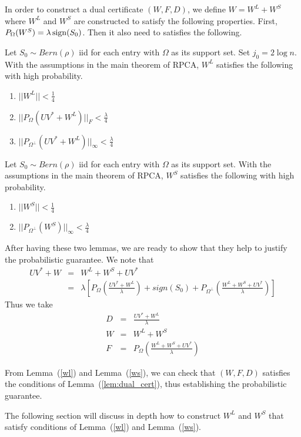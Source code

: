 In order to construct a dual certificate $(W, F, D)$, we define $W = W^{L}+W^{S}$ where $W^{L}$ and $W^{S}$ are constructed to satisfy the following
properties. First, $P_{\Omega}(W^{S}) = \lambda \operatorname{sign}(S_0)$. Then it also need to satisfies the following.

\begin{lemma} \label{wl} Let $S_0\sim Bern(\rho)$ iid for each entry with $\Omega$
as its support set. Set $j_{0}=2\log n$. With the assumptions in
the main theorem of RPCA, $W^{L}$ satisfies the following with high
probability.
\begin{enumerate}
\item $||W^{L}||<\frac{1}{4}$
\item $||P_{\Omega}(UV^{*}+W^{L})||_{F}<\frac{\lambda}{4}$
\item $||P_{\Omega^{\bot}}(UV^{*}+W^{L})||_{\infty}<\frac{\lambda}{4}$
\end{enumerate}
\end{lemma}

\begin{lemma} \label{ws} Let $S_0\sim Bern(\rho)$ iid for each entry with $\Omega$
as its support set. With the assumptions in the main theorem of RPCA,
$W^{S}$ satisfies the following with high probability.
\begin{enumerate}
\item $||W^{S}||<\frac{1}{4}$
\item $||P_{\Omega^{\bot}}(W^{S})||_{\infty}<\frac{\lambda}{4}$
\end{enumerate}
\end{lemma}

After having these two lemmas, we are ready to show that they help to justify the probabilistic guarantee. We note that
\begin{eqnarray*}
UV^{*}+W & = & W^{L}+W^{S}+UV^{*}\\
 & = & \lambda \left[ P_{\Omega} \left( \frac{UV^{*}+W^{L}}{\lambda} \right) + sign(S_{0}) + P_{\Omega^{\bot}} \left( \frac{W^{L}+W^{S}+UV^{*}}{\lambda} \right) \right]
\end{eqnarray*}
Thus we take
\begin{eqnarray*}
D & = & \frac{UV^{*}+W^{L}}{\lambda}\\
W & = & W^{L}+W^{S}\\
F & = & P_{\Omega} \left( \frac{W^{L}+W^{S}+UV^{*}}{\lambda} \right)
\end{eqnarray*}


From Lemma~(\ref{wl}) and Lemma~(\ref{ws}), we can check that $(W,F,D)$ satisfies the conditions of Lemma~(\ref{lem:dual_cert}), thus establishing the probabilistic guarantee.

The following section will discuss in depth how to construct $W^{L}$ and $W^{S}$ that satisfy conditions of Lemma~(\ref{wl}) and Lemma~(\ref{ws}). 